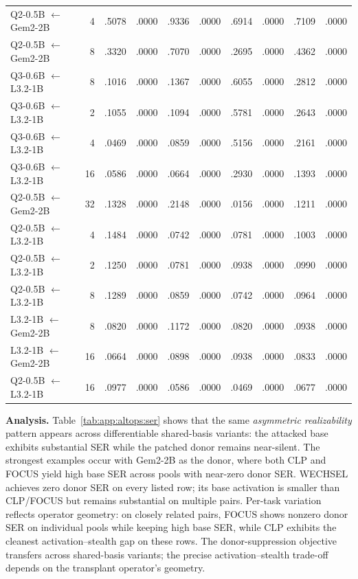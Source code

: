 \documentclass{article}
\theoremstyle{plain}
\theoremstyle{definition}
\theoremstyle{remark}
\begin{document}
\begin{longtable}{p{}rrrrrrrrr}
Q2-0.5B $\leftarrow$ Gem2-2B & 4 & .5078 & .0000 & .9336 & .0000 & .6914 & .0000 & .7109 & .0000 \\
Q2-0.5B $\leftarrow$ Gem2-2B & 8 & .3320 & .0000 & .7070 & .0000 & .2695 & .0000 & .4362 & .0000 \\
Q3-0.6B $\leftarrow$ L3.2-1B & 8 & .1016 & .0000 & .1367 & .0000 & .6055 & .0000 & .2812 & .0000 \\
Q3-0.6B $\leftarrow$ L3.2-1B & 2 & .1055 & .0000 & .1094 & .0000 & .5781 & .0000 & .2643 & .0000 \\
Q3-0.6B $\leftarrow$ L3.2-1B & 4 & .0469 & .0000 & .0859 & .0000 & .5156 & .0000 & .2161 & .0000 \\
Q3-0.6B $\leftarrow$ L3.2-1B & 16 & .0586 & .0000 & .0664 & .0000 & .2930 & .0000 & .1393 & .0000 \\
Q2-0.5B $\leftarrow$ Gem2-2B & 32 & .1328 & .0000 & .2148 & .0000 & .0156 & .0000 & .1211 & .0000 \\
Q2-0.5B $\leftarrow$ L3.2-1B & 4 & .1484 & .0000 & .0742 & .0000 & .0781 & .0000 & .1003 & .0000 \\
Q2-0.5B $\leftarrow$ L3.2-1B & 2 & .1250 & .0000 & .0781 & .0000 & .0938 & .0000 & .0990 & .0000 \\
Q2-0.5B $\leftarrow$ L3.2-1B & 8 & .1289 & .0000 & .0859 & .0000 & .0742 & .0000 & .0964 & .0000 \\
L3.2-1B $\leftarrow$ Gem2-2B & 8 & .0820 & .0000 & .1172 & .0000 & .0820 & .0000 & .0938 & .0000 \\
L3.2-1B $\leftarrow$ Gem2-2B & 16 & .0664 & .0000 & .0898 & .0000 & .0938 & .0000 & .0833 & .0000 \\
Q2-0.5B $\leftarrow$ L3.2-1B & 16 & .0977 & .0000 & .0586 & .0000 & .0469 & .0000 & .0677 & .0000 \\
\end{longtable}
\endgroup



\noindent\textbf{Analysis.}
Table~\ref{tab:app:altops:ser} shows that the same \emph{asymmetric realizability} pattern appears across differentiable shared-basis variants: the attacked base exhibits substantial SER while the patched donor remains near-silent.
The strongest examples occur with Gem2-2B as the donor, where both CLP and FOCUS yield high base SER across pools with near-zero donor SER.
WECHSEL achieves zero donor SER on every listed row; its base activation is smaller than CLP/FOCUS but remains substantial on multiple pairs.
Per-task variation reflects operator geometry: on closely related pairs, FOCUS shows nonzero donor SER on individual pools while keeping high base SER, while CLP exhibits the cleanest activation--stealth gap on these rows.
The donor-suppression objective transfers across shared-basis variants; the precise activation--stealth trade-off depends on the transplant operator's geometry.
\end{document}
